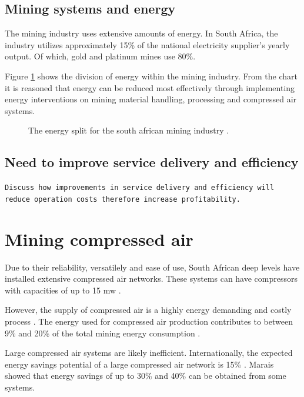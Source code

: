 \subsection{Mining systems and energy}
The mining industry uses extensive amounts of energy. In South Africa, the industry utilizes approximately 15\% of the national electricity supplier's yearly output. Of which, gold and platinum mines use 80\%.\cite{Eskom2010Energy}\par
Figure \ref{fig: Energy Split} shows the division of energy within the mining industry. From the chart it is reasoned that energy can be reduced most effectively through implementing energy interventions on mining material handling, processing and compressed air systems.
\begin{figure}[h]
	\centering
	\caption[The energy split for the south african mining industry.]{The energy split for the south african mining industry \cite{Eskom2010Energy}.}
	\label{fig: Energy Split}
\end{figure}
\par
\subsection{Need to improve service delivery and efficiency}
\texttt{Discuss how improvements in service delivery and efficiency will reduce operation costs therefore increase profitability.}
\section{Mining compressed air}
Due to their reliability, versatilely and ease of use, South African deep levels have installed extensive compressed air networks. These systems can have compressors with capacities of up to 15 \gls{mw} \cite{Marais2012PhD}.\par
However, the supply of compressed air is a highly energy demanding and costly process \cite{padachi2009energy}.  The energy used for compressed air production contributes to between 9\% and 20\% of the total mining energy consumption \cite{Eskom2010Energy,du2011development}. \par
Large compressed air systems are likely inefficient. Internationally, the expected energy savings potential of a large compressed air network is 15\% \cite{neale2009compressed}. Marais \cite{marais2013simplification} showed that energy savings of up to 30\% and 40\% can be obtained from some systems. 
